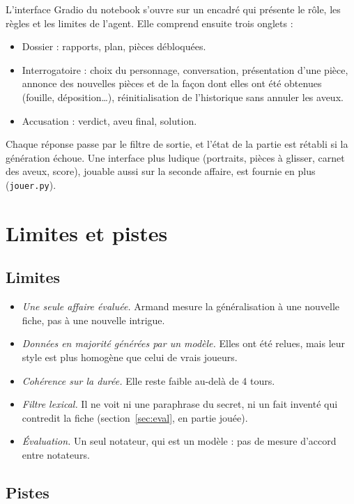 \documentclass[11pt,a4paper]{article}
\begin{document}
L'interface Gradio du notebook s'ouvre sur un encadré qui présente le rôle, les règles et les limites de l'agent. Elle comprend ensuite trois onglets :
\begin{itemize}
  \item Dossier : rapports, plan, pièces débloquées.
  \item Interrogatoire : choix du personnage, conversation, présentation d'une pièce, annonce des nouvelles pièces et de la façon dont elles ont été obtenues (fouille, déposition\ldots), réinitialisation de l'historique sans annuler les aveux.
  \item Accusation : verdict, aveu final, solution.
\end{itemize}
Chaque réponse passe par le filtre de sortie, et l'état de la partie est rétabli si la génération échoue. Une interface plus ludique (portraits, pièces à glisser, carnet des aveux, score), jouable aussi sur la seconde affaire, est fournie en plus (\texttt{jouer.py}).

\section{Limites et pistes}

\subsection{Limites}

\begin{itemize}
  \item \emph{Une seule affaire évaluée.} Armand mesure la généralisation à une nouvelle fiche, pas à une nouvelle intrigue.
  \item \emph{Données en majorité générées par un modèle.} Elles ont été relues, mais leur style est plus homogène que celui de vrais joueurs.
  \item \emph{Cohérence sur la durée.} Elle reste faible au-delà de 4 tours.
  \item \emph{Filtre lexical.} Il ne voit ni une paraphrase du secret, ni un fait inventé qui contredit la fiche (section~\ref{sec:eval}, en partie jouée).
  \item \emph{Évaluation.} Un seul notateur, qui est un modèle : pas de mesure d'accord entre notateurs.
\end{itemize}

\subsection{Pistes}
\end{document}
